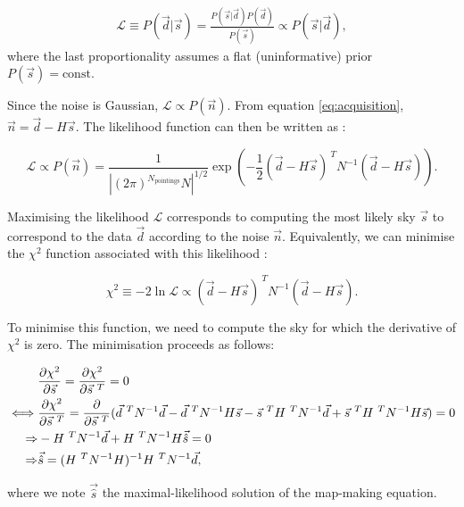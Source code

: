 \documentclass[../../thesis.tex]{subfiles}
\begin{document}
\begin{align}
    \mathcal{L} \equiv P(\vec{d} | \vec{s}) = \frac{P(\vec{s}|\vec{d})P(\vec{d})}{P(\vec{s})} \propto P(\vec{s}|\vec{d}),
\end{align}
where the last proportionality assumes a flat (uninformative) prior $P(\vec{s}) = \text{const}$.

Since the noise is Gaussian, $\mathcal{L} \propto P(\vec{n})$.
From equation \ref{eq:acquisition}, $\vec{n} = \vec{d} - H\vec{s}$. The likelihood function can then be written as : 

\begin{equation}
    \mathcal{L} \propto P(\vec{n}) = \frac{1}{\left|(2\pi)^{N_{\text{pointings}}}N\right|^{1/2}} \exp\left(-\frac{1}{2}(\vec{d} - H\vec{s})^{~T} N^{-1}(\vec{d} - H\vec{s})\right).
\end{equation}

Maximising the likelihood $\mathcal{L}$ corresponds to computing the most likely sky $\vec{s}$ to correspond to the data $\vec{d}$ according to the noise $\vec{n}$. Equivalently, we can minimise the $\chi^2$ function associated with this likelihood : 

\begin{equation}
    \chi^2 \equiv -2\ln\mathcal{L} \propto (\vec{d} - H\vec{s})^{~T} N^{-1}(\vec{d} - H\vec{s}).
\end{equation}

To minimise this function, we need to compute the sky for which the derivative of $\chi^2$ is zero. The minimisation proceeds as follows: 

\begin{align} \label{eq:mapmaking_inv}
    & \frac{\partial \chi^2}{\partial \vec{s}} = \frac{\partial \chi^2}{\partial \vec{s}^{~T}} = 0 \notag \\
     \iff  & \frac{\partial \chi^2}{\partial \vec{s}^{~T}} = \frac{\partial}{\partial \vec{s}^{~T}}(\vec{d}^{~T} N^{-1}\vec{d} - \vec{d}^{~T} N^{-1} H\vec{s} - \vec{s}^{~T} H^{~T} N^{-1}\vec{d} + \vec{s}^{~T} H^{~T} N^{-1}H\vec{s}) = 0 \notag \\
     \Rightarrow & - H^{~T} N^{-1} \vec{d} + H^{~T} N^{-1} H\vec{\hat{s}} = 0 \notag \\
     \Rightarrow & \vec{\hat{s}} = (H^{~T} N^{-1} H)^{-1} H^{~T} N^{-1} \vec{d},
\end{align}

where we note $\vec{\hat{s}}$ the maximal-likelihood solution of the map-making equation. 
\end{document}
